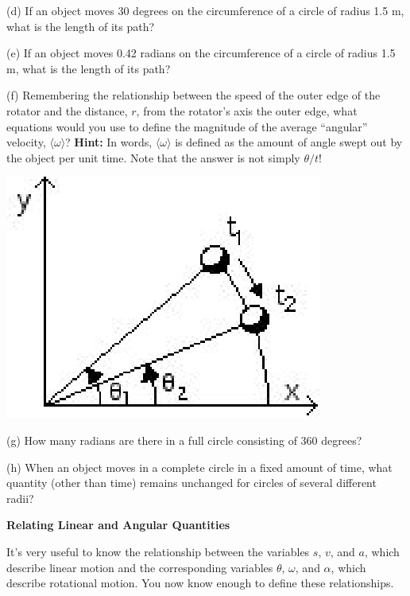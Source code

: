 (d) If an object moves 30 degrees on the circumference of a circle of radius
1.5 m, what is the length of its path?
\answerspace{20mm}

(e) If an object moves 0.42 radians on the circumference of a circle of radius
1.5 m, what is the length of its path?
\answerspace{20mm}

(f) Remembering the relationship between the speed of the outer edge of the
rotator and the distance, $r$, 
from the rotator's axis the outer edge, what equations
would you use to define the magnitude of the average ``angular''
velocity, \( \langle\omega \rangle \)? \textbf{Hint:} In words, 
\( \langle\omega \rangle \) is defined
as the amount of angle swept out by the object per unit time. Note that the
answer is not simply \( \theta/t  \)!

\vspace{0.3cm}
{\par\raggedright \includegraphics{rotation/rotation_fig8.eps} \par}
\vspace{0.3cm}

(g) How many radians are there in a full circle consisting of 360 degrees?
\vspace{10mm}

(h) When an object moves in a complete circle in a fixed amount of time, what
quantity (other than time) remains unchanged for circles of several different
radii? 
\vspace{10mm}

\textbf{Relating Linear and Angular Quantities} 

It's very useful to know the relationship between the variables 
$s$, $v$, and $a$,
which describe linear motion and the corresponding variables \( \theta  \),
\( \omega  \), and \( \alpha  \), which describe rotational motion. You now
know enough to define these relationships.

